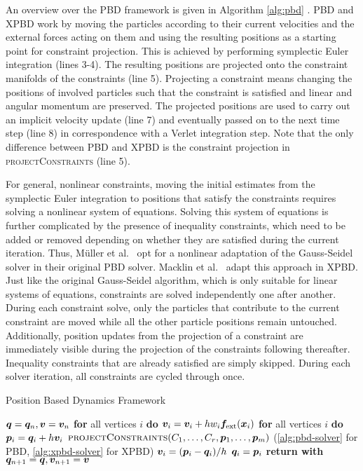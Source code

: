 An overview over the PBD framework is given in Algorithm \ref{alg:pbd} \cite{mueller2006}. PBD and XPBD work by moving the particles according to their current 
velocities and the external forces acting on them and using the resulting positions as a starting point for constraint projection. This is achieved by 
performing symplectic Euler integration (lines 3-4). The resulting positions 
are projected onto the constraint manifolds of the constraints (line 5). Projecting a constraint means changing the positions of involved particles 
such that the constraint is satisfied and linear and angular momentum are preserved. The projected positions are used to carry out an implicit 
velocity update (line 7) and eventually passed on to the next time step (line 8) in correspondence with a Verlet integration step. Note that the only
difference between PBD and XPBD is the constraint projection in \textsc{projectConstraints} (line 5).

For general, nonlinear constraints, moving the initial estimates from the symplectic Euler integration to positions that satisfy the constraints
requires solving a nonlinear system of equations. Solving this system of equations is further complicated by the presence of inequality constraints, which
need to be added or removed depending on whether they are satisfied during the current iteration. Thus, Müller et al.\ \cite{mueller2006} opt for a 
nonlinear adaptation of the Gauss-Seidel solver in their original PBD solver. Macklin et al.\ \cite{macklin2016} adapt this approach in XPBD. 
Just like the original Gauss-Seidel algorithm, which is only suitable for linear systems of equations, 
constraints are solved independently one after another. During each constraint solve, only the particles that contribute to the current constraint are
moved while all the other particle positions remain untouched. Additionally, position updates from the projection of a constraint are immediately 
visible during the projection of the constraints following thereafter. Inequality constraints that are already satisfied are simply skipped. 
During each solver iteration, all constraints are cycled through once.

\begin{algorithm}[tb]
\caption{Position Based Dynamics Framework}\label{alg:pbd}
\begin{algorithmic}[1]
\State $\bm{q} = \bm{q}_n, \bm{v} = \bm{v}_n$
\State \textbf{for} all vertices $i$ \textbf{do} $\bm{v}_i = \bm{v}_i + hw_i\bm{f}_{\text{ext}}(\bm{x}_i)$
\State \textbf{for} all vertices $i$ \textbf{do} $\bm{p}_i = \bm{q}_i + h\bm{v}_i$
\State $\textsc{projectConstraints}(C_1, \ldots, C_r, \bm{p}_1, \ldots, \bm{p}_m)$ (\cref{alg:pbd-solver} for PBD, 
\StatexIndent[2] \cref{alg:xpbd-solver} for XPBD)
\State $\bm{v}_i = (\bm{p}_i - \bm{q}_i) / h$
\State $\bm{q}_i = \bm{p}_i$
\EndFor
\State \textbf{return with } $\bm{q}_{n+1} = \bm{q}, \bm{v}_{n+1} = \bm{v}$
\EndProcedure
\end{algorithmic}
\end{algorithm}

